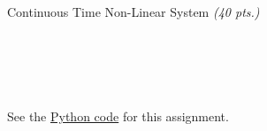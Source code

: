 \begin{hwkProblem}{3}{Continuous Time Non-Linear System \textit{(40 pts.)}}
	\inputminted{python}{./outputs/text/s03d.txt}

	\hwkPart{} \label{hwk:s03e}

	\inputminted{python}{./outputs/text/s03e.txt}

	\hwkPart{} \label{hwk:s03f}

	\inputminted{python}{./outputs/text/s03f.txt}

	\hwkPart{} \label{hwk:s03g}

	\inputminted{python}{./outputs/text/s03g.txt}

	\hwkPart{} \label{hwk:s03h}

	\inputminted{python}{./outputs/text/s03h.txt}

	\hwkPart{} \label{hwk:s03i}

	\inputminted{python}{./outputs/text/s03i.txt}

	\hwkCode{} \label{code:s03}

	See the \href{https://www.github.com/vaisriv/enae441-hw03/blob/main/src/hw03.py#L0}{Python code} for this assignment.

\end{hwkProblem}


